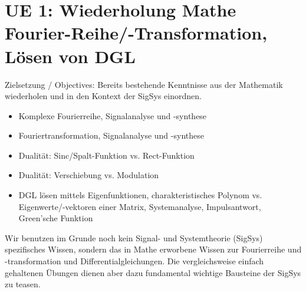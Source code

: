 
\newpage
\section{UE 1: Wiederholung Mathe Fourier-Reihe/-Transformation, Lösen von DGL}
\label{sec:ue1_intro}
Zielsetzung / Objectives: Bereits bestehende Kenntnisse aus der Mathematik
wiederholen und in den Kontext der SigSys einordnen.

\begin{itemize}
\item Komplexe Fourierreihe, Signalanalyse und -synthese
\item Fouriertransformation, Signalanalyse und -synthese
\item Dualität: Sinc/Spalt-Funktion vs. Rect-Funktion
\item Dualität: Verschiebung vs. Modulation
\item DGL lösen mittels Eigenfunktionen, charakteristisches Polynom vs. Eigenwerte/-vektoren einer Matrix, Systemanalyse, Impulsantwort, Green'sche Funktion
\end{itemize}
%
Wir benutzen im Grunde noch kein Signal- und Systemtheorie (SigSys) spezifisches Wissen,
sondern das in Mathe erworbene Wissen zur Fourierreihe und -transformation
und Differentialgleichungen. Die vergleichsweise einfach gehaltenen
Übungen dienen aber dazu fundamental wichtige Bausteine der SigSys zu teasen.


\newpage
